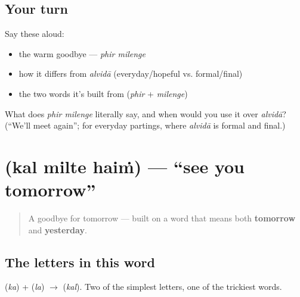 \subsection*{Your turn}
Say these aloud:

\begin{itemize}
\raggedright
  \item the warm goodbye — \emph{phir milenge}
  \item how it differs from \emph{alvidā} (everyday/hopeful vs. formal/final)
  \item the two words it's built from (\emph{phir} + \emph{milenge})
\end{itemize}

\begin{tcolorbox}[breakable,colback=teal!4,colframe=teal!35!black,title={Before you move on}]
What does \emph{phir milenge} literally say, and when would you use it over \emph{alvidā}? (\textquotedblleft{}We'll meet again\textquotedblright{}; for everyday partings, where \emph{alvidā} is formal and final.)
\end{tcolorbox}
\section[\texorpdfstring{\hi{कल} \hi{मिलते} \hi{हैं} (kal milte haiṁ)}{कल मिलते हैं (kal milte haiṁ)}]{   (kal milte haiṁ) — \textquotedblleft{}see you tomorrow\textquotedblright{}}

\label{lesson:HI-C04-kal-milte-hain}



\begin{quote}
A goodbye for tomorrow — built on a word that means both \textbf{tomorrow} and \textbf{yesterday}.
\end{quote}

\subsection*{The letters in this word}
\textbf{} (\emph{ka}) + \textbf{} (\emph{la}) $\to$ \textbf{} (\emph{kal}). Two of the simplest letters, one of the trickiest words.

